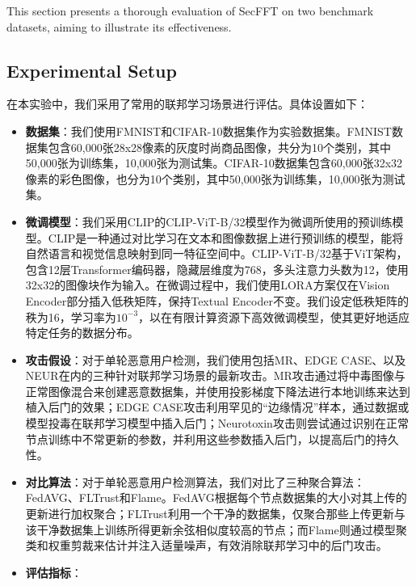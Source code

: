 \documentclass[lettersize,journal]{IEEEtran}
\begin{document}
This section presents a thorough evaluation of SecFFT on two benchmark datasets, aiming to illustrate its effectiveness.

\subsection{Experimental Setup}

在本实验中，我们采用了常用的联邦学习场景进行评估。具体设置如下：

\begin{itemize}
    \item \textbf{数据集}：我们使用FMNIST\cite{minist}和CIFAR-10\cite{cifar10}数据集作为实验数据集。FMNIST数据集包含60,000张28x28像素的灰度时尚商品图像，共分为10个类别，其中50,000张为训练集，10,000张为测试集。CIFAR-10数据集包含60,000张32x32像素的彩色图像，也分为10个类别，其中50,000张为训练集，10,000张为测试集。
    
    \item \textbf{微调模型}：我们采用CLIP的CLIP-ViT-B/32\cite{huggingface_clip}模型作为微调所使用的预训练模型。CLIP是一种通过对比学习在文本和图像数据上进行预训练的模型，能将自然语言和视觉信息映射到同一特征空间中。CLIP-ViT-B/32基于ViT\cite{vit}架构，包含12层Transformer编码器，隐藏层维度为768，多头注意力头数为12，使用32x32的图像块作为输入。在微调过程中，我们使用LORA\cite{lora}方案仅在Vision Encoder部分插入低秩矩阵，保持Textual Encoder不变。我们设定低秩矩阵的秩为16，学习率为$10^{-3}$，以在有限计算资源下高效微调模型，使其更好地适应特定任务的数据分布。

    \item \textbf{攻击假设}：对于单轮恶意用户检测，我们使用包括MR\cite{MR}、EDGE CASE\cite{EDGE_CASE}、以及NEUR\cite{zhang2022neurotoxin}在内的三种针对联邦学习场景的最新攻击。MR攻击通过将中毒图像与正常图像混合来创建恶意数据集，并使用投影梯度下降法进行本地训练来达到植入后门的效果；EDGE CASE攻击利用罕见的“边缘情况”样本，通过数据或模型投毒在联邦学习模型中插入后门；Neurotoxin攻击则尝试通过识别在正常节点训练中不常更新的参数，并利用这些参数插入后门，以提高后门的持久性。

    \item \textbf{对比算法}：对于单轮恶意用户检测算法，我们对比了三种聚合算法：FedAVG\cite{FedAVG}、FLTrust\cite{FLTrust}和Flame\cite{FLAME}。FedAVG根据每个节点数据集的大小对其上传的更新进行加权聚合；FLTrust利用一个干净的数据集，仅聚合那些上传更新与该干净数据集上训练所得更新余弦相似度较高的节点；而Flame则通过模型聚类和权重剪裁来估计并注入适量噪声，有效消除联邦学习中的后门攻击。
    
    \item \textbf{评估指标}：
    
    
\end{itemize}
\end{document}
